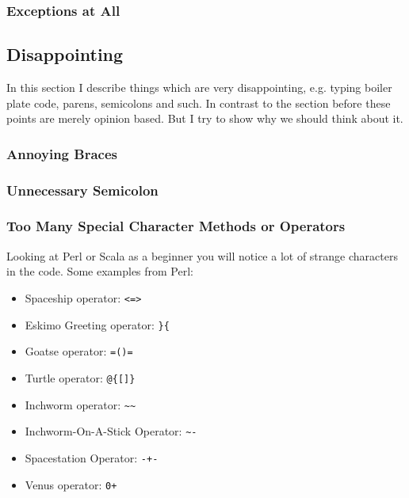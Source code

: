 \documentclass[a4paper,12pt]{article}
\begin{document}

\subsubsection{Exceptions at All}


\subsection{Disappointing}

In this section I describe things which are very disappointing, e.g. typing boiler plate code, parens, semicolons and such. In contrast to the section before these points are merely opinion based. But I try to show why we should think about it.

\subsubsection{Annoying Braces}


\subsubsection{Unnecessary Semicolon}


\subsubsection{Too Many Special Character Methods or Operators}

Looking at Perl or Scala as a beginner you will notice a lot of strange characters in the code.
Some examples from Perl\cite{secret-perl-operators}:

\begin{itemize}
    \item Spaceship operator: \verb|<=>|
    \item Eskimo Greeting operator: \verb|}{|
    \item Goatse operator: \verb|=()=|
    \item Turtle operator: \verb|@{[]}|
    \item Inchworm operator: \verb|~~|
    \item Inchworm-On-A-Stick Operator: \verb|~-|
    \item Spacestation Operator: \verb|-+-|
    \item Venus operator: \verb|0+|
\end{itemize}
\end{document}
